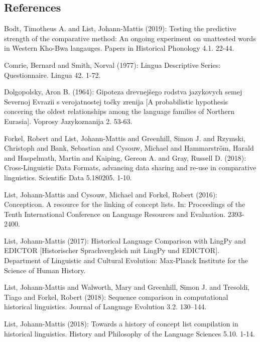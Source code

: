 \documentclass[
  a4paper,
  14pt,
  oneside,
  tablecaptionabove
]{scrbook}
\begin{document}
\subsection*{References}

\nopagebreak\hangindent=0.7cm {\small Bodt, Timotheus A. and List, Johann-Mattis (2019): Testing the
predictive strength of the comparative method: An ongoing experiment on
unattested words in Western Kho-Bwa langauges. Papers in Historical
Phonology 4.1. 22-44. }

\nopagebreak\hangindent=0.7cm {\small Comrie, Bernard and Smith, Norval (1977): Lingua Descriptive Series:
Questionnaire. Lingua 42. 1-72. }

\nopagebreak\hangindent=0.7cm {\small Dolgopolsky, Aron B. (1964): Gipoteza drevnejšego rodstva jazykovych
semej Severnoj Evrazii s verojatnostej točky zrenija {[}A probabilistic
hypothesis concering the oldest relationships among the language
families of Northern Eurasia{]}. Voprosy Jazykoznanija 2. 53-63. }

\nopagebreak\hangindent=0.7cm {\small Forkel, Robert and List, Johann-Mattis and Greenhill, Simon J. and
Rzymski, Christoph and Bank, Sebastian and Cysouw, Michael and
Hammarström, Harald and Haspelmath, Martin and Kaiping, Gereon A. and
Gray, Russell D. (2018): Cross-Linguistic Data Formats, advancing data
sharing and re-use in comparative linguistics. Scientific Data 5.180205.
1-10. }

\nopagebreak\hangindent=0.7cm {\small List, Johann-Mattis and Cysouw, Michael and Forkel, Robert (2016):
Concepticon. A resource for the linking of concept lists. In:
Proceedings of the Tenth International Conference on Language Resources
and Evaluation. 2393-2400. }

\nopagebreak\hangindent=0.7cm {\small List, Johann-Mattis (2017): Historical Language Comparison with
LingPy and EDICTOR {[}Historischer Sprachvergleich mit LingPy und
EDICTOR{]}. Department of Linguistic and Cultural Evolution: Max-Planck
Institute for the Science of Human History. }

\nopagebreak\hangindent=0.7cm {\small List, Johann-Mattis and Walworth, Mary and Greenhill, Simon J. and
Tresoldi, Tiago and Forkel, Robert (2018): Sequence comparison in
computational historical linguistics. Journal of Language Evolution 3.2.
130--144. }

\nopagebreak\hangindent=0.7cm {\small List, Johann-Mattis (2018): Towards a history of concept list
compilation in historical linguistics. History and Philosophy of the
Language Sciences 5.10. 1-14. }
\end{document}
